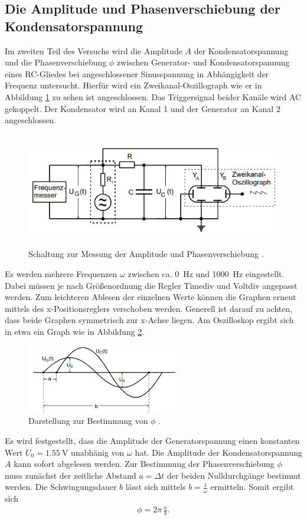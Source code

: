 \subsection{Die Amplitude und Phasenverschiebung der Kondensatorspannung}
Im zweiten Teil des Versuchs wird die Amplitude $A$ der Kondensatorspannung und die Phasenverschiebung $\phi$ zwischen Generator-
und Kondensatorspannung eines RC-Gliedes bei angeschlossener Sinusspannung in Abhängigkeit der Frequenz untersucht.
Hierfür wird ein Zweikanal-Oszillograph wie er in Abbildung \ref{fig:ampl_phasenverschiebung} zu sehen ist angeschlossen.
Das Triggersignal beider Kanäle wird AC gekoppelt.
Der Kondensator wird an Kanal 1 und der Generator an Kanal 2 angeschlossen.
\begin{figure}[H]
    \centering
    \includegraphics[height=5cm]{abbildungen/ampl_phasenverschiebung.png}
    \caption{Schaltung zur Messung der Amplitude und Phasenverschiebung \cite{man:v353}.}
    \label{fig:ampl_phasenverschiebung}
\end{figure}
\noindent
Es werden mehrere Frequenzen $\omega$ zwischen ca. \qty{0}{\hertz} und \qty{1000}{\hertz} eingestellt.
Dabei müssen je nach Größenordnung die Regler Timediv und Voltdiv angepasst werden.
Zum leichteren Ablesen der einzelnen Werte können die Graphen erneut mittels des x-Positionsreglers verschoben werden.
Generell ist darauf zu achten, dass beide Graphen symmetrisch zur x-Achse liegen.
Am Oszilloskop ergibt sich in etwa ein Graph wie in Abbildung \ref{fig:graph_phasenverschiebung}.
\begin{figure}[H]
    \centering
    \includegraphics[height=3cm]{abbildungen/graph_phasenverschiebung.png}
    \caption{Darstellung zur Bestimmung von $\phi$ \cite{man:v353}.}
    \label{fig:graph_phasenverschiebung}
\end{figure}
\noindent
Es wird festgestellt, dass die Amplitude der Generatorspannung einen konstanten Wert $U_0 = \qty[]{1.55}{\volt}$ unabhänig von $\omega$ hat.
Die Amplitude der Kondensatorspannung $A$ kann sofort abgelesen werden.
Zur Bestimmung der Phasenverschiebung $\phi$ muss zunächst der zeitliche Abstand $a = \Delta t$ der beiden Nulldurchgänge bestimmt werden.
Die Schwingungsdauer $b$ lässt sich mittels $b = \frac{1}{\omega}$ ermitteln.
Somit ergibt sich 
\begin{align}
    \phi = 2 \pi \, \frac{a}{b}.
    \label{eq:phase}
\end{align}
%